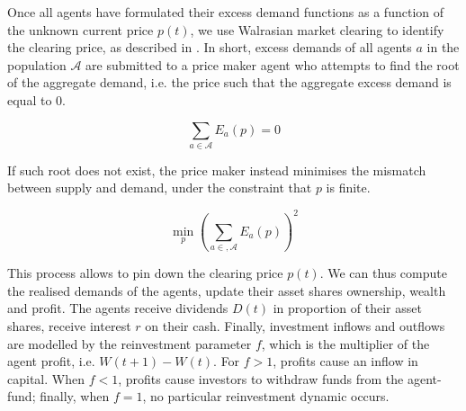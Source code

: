 \documentclass{article}
\begin{document}
Once all agents have formulated their excess demand functions as a function of the unknown current price $p(t)$, we use Walrasian market clearing to identify the clearing price, as described in \cite{scholl2020market}. In short, excess demands of all agents $a$ in the population $ \mathcal{A}$ are submitted to a price maker agent who attempts to find the root of the aggregate demand, i.e. the price such that the aggregate excess demand is equal to 0.

\begin{equation}
\label{market_clearing_root}
\sum_{a \in \mathcal{A}} E_{a}(p)=0
\end{equation}

If such root does not exist, the price maker instead minimises the mismatch between supply and demand, under the constraint that $p$ is finite.

\begin{equation}
\label{market_clearing_mismatch}
\min_p\left(\sum_{a \in, \mathcal{A}} E_{a}(p)\right)^{2}
\end{equation}

This process allows to pin down the clearing price $p(t)$. We can thus compute the realised demands of the agents, update their asset shares ownership, wealth and profit. The agents receive dividends $D(t)$ in proportion of their asset shares, receive interest $r$ on their cash. Finally, investment inflows and outflows are modelled by the reinvestment parameter $f$, which is the multiplier of the agent profit, i.e. $W(t+1) - W(t)$. For $f > 1$, profits cause an inflow in capital. When $f < 1$, profits cause investors to withdraw funds from the agent-fund; finally, when $f=1$, no particular reinvestment dynamic occurs. 
\end{document}
